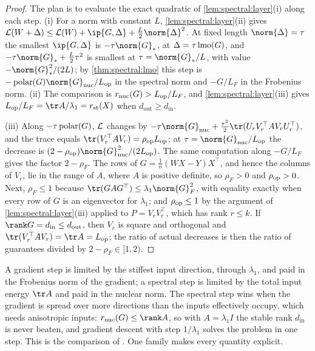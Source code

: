 \begin{refsection}
\begin{proof}
The plan is to evaluate the exact quadratic of \cref{lem:spectral:layer}(i) along each step. (i) For a norm with constant $L$, \cref{lem:spectral:layer}(ii) gives $\Loss(W+\Delta)\le\Loss(W)+\ip{G,\Delta}+\frac L2\norm{\Delta}^2$. At fixed length $\norm{\Delta}=\tau$ the smallest $\ip{G,\Delta}$ is $-\tau\norm{G}_*$, at $\Delta=\tau\operatorname{lmo}(G)$, and $-\tau\norm{G}_*+\frac L2\tau^2$ is smallest at $\tau=\norm{G}_*/L$, with value $-\norm{G}_*^2/(2L)$; by \cref{thm:spectral:lmo} this step is $-\polar(G)\norm{G}_{\nuc}/L_{\op}$ in the spectral norm and $-G/L_F$ in the Frobenius norm. (ii) The comparison is $r_{\mathrm{nuc}}(G)>L_{\mathrm{op}}/L_F$, and \cref{lem:spectral:layer}(iii) gives $L_{\op}/L_F=\tr A/\lambda_1=\spectralrst(X)$ when $d_{\mathrm{out}}\ge d_{\mathrm{in}}$.

(iii) Along $-\tau\operatorname{polar}(G)$, $\mathcal{L}$ changes by $-\tau\norm{G}_{\nuc}+\frac{\tau^2}2\tr(U_rV_r^\top AV_rU_r^\top)$, and the trace equals $\tr(V_r^\top AV_r)=\rho_{\op}L_{\op}$; at $\tau=\norm{G}_{\nuc}/L_{\op}$ the decrease is $(2-\rho_{\op})\norm{G}_{\nuc}^2/(2L_{\op})$. The same computation along $-G/L_F$ gives the factor $2-\rho_F$. The rows of $G=\frac1n(WX-Y)X^\top$, and hence the columns of $V_r$, lie in the range of $A$, where $A$ is positive definite, so $\rho_F>0$ and $\rho_{\mathrm{op}}>0$. Next, $\rho_F\le1$ because $\tr(GAG^\top)\le\lambda_1\norm{G}_F^2$, with equality exactly when every row of $G$ is an eigenvector for $\lambda_1$; and $\rho_{\mathrm{op}}\le1$ by the argument of \cref{lem:spectral:layer}(iii) applied to $P=V_rV_r^\top$, which has rank $r\le k$. If $\rank G=d_{\mathrm{in}}\le d_{\mathrm{out}}$, then $V_r$ is square and orthogonal and $\tr(V_r^\top AV_r)=\tr A=L_{\op}$; the ratio of actual decreases is then the ratio of guarantees divided by $2-\rho_F\in[1,2)$.
\end{proof}

A gradient step is limited by the stiffest input direction, through $\lambda_1$, and paid in the Frobenius norm of the gradient; a spectral step is limited by the total input energy $\tr A$ and paid in the nuclear norm. The spectral step wins when the gradient is spread over more directions than the inputs effectively occupy, which needs anisotropic inputs: $\spectralrnuc(G)\le\rank A$, so with $A=\lambda_1I$ the stable rank $d_{\mathrm{in}}$ is never beaten, and gradient descent with step $1/\lambda_1$ solves the problem in one step. This is the comparison of \textcite{DavisDrusvyatskiy2025}. One family makes every quantity explicit.


\end{refsection}
